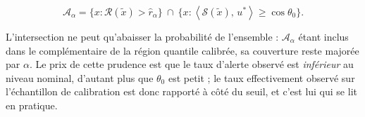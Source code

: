 \documentclass[11pt,a4paper]{article}
\theoremstyle{definition}
\theoremstyle{remark}
\newcommand{\scal}[2]{\left\langle #1 ,\, #2 \right\rangle}
\begin{document}
\medskip

\[
  \mathcal{A}_\alpha
  = \big\{ x : \mathcal{R}(\tilde{x}) > \hat{r}_\alpha \big\}
  \ \cap\
  \big\{ x : \scal{\mathcal{S}(\tilde{x})}{u^{*}} \ge \cos\theta_0 \big\}.
\]

\bigskip

L'intersection ne peut qu'abaisser la probabilité de l'ensemble : $\mathcal{A}_\alpha$ étant
inclus dans le complémentaire de la région quantile calibrée, sa couverture reste majorée
par $\alpha$. Le prix de cette prudence est que le taux d'alerte observé est \emph{inférieur}
au niveau nominal, d'autant plus que $\theta_0$ est petit ; le taux effectivement observé
sur l'échantillon de calibration est donc rapporté à côté du seuil, et c'est lui qui se lit
en pratique.

\medskip
\end{document}
